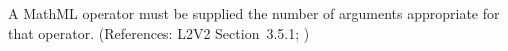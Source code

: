 A MathML operator must be supplied the number of arguments appropriate for
that operator.  (References: L2V2 Section~3.5.1; )
